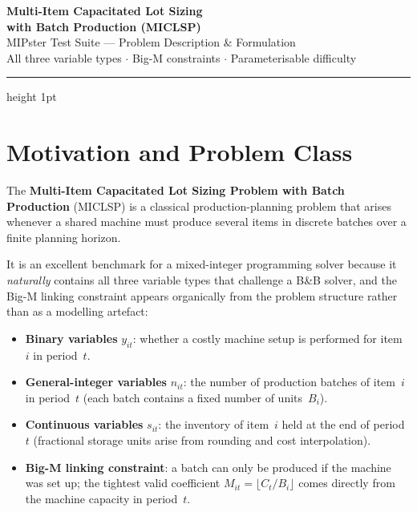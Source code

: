 \documentclass[11pt,a4paper]{article}
\begin{document}
\begin{center}
  {\LARGE\bfseries\color{mipblue}
    Multi-Item Capacitated Lot Sizing\\[4pt]
    with Batch Production (MICLSP)}\\[0.8em]
  {\large\color{mipgray} MIPster Test Suite --- Problem Description \& Formulation}\\[0.4em]
  {\small\color{mipgray} All three variable types $\cdot$ Big-M constraints $\cdot$
   Parameterisable difficulty}
\end{center}

\vspace{0.5em}
\hrule height 1pt
\vspace{1.5em}

\section{Motivation and Problem Class}

The \textbf{Multi-Item Capacitated Lot Sizing Problem with Batch Production}
(MICLSP) is a classical production-planning problem that arises whenever a
shared machine must produce several items in discrete batches over a finite
planning horizon.

It is an excellent benchmark for a mixed-integer programming solver because
it \emph{naturally} contains all three variable types that challenge a B\&B
solver, and the Big-M linking constraint appears organically from the problem
structure rather than as a modelling artefact:

\begin{itemize}[leftmargin=1.8em]
  \item \textbf{Binary variables} $y_{it}$: whether a costly machine setup is
        performed for item~$i$ in period~$t$.
  \item \textbf{General-integer variables} $n_{it}$: the number of production
        batches of item~$i$ in period~$t$ (each batch contains a fixed number
        of units~$B_i$).
  \item \textbf{Continuous variables} $s_{it}$: the inventory of item~$i$ held
        at the end of period~$t$ (fractional storage units arise from rounding
        and cost interpolation).
  \item \textbf{Big-M linking constraint}: a batch can only be produced if the
        machine was set up; the tightest valid coefficient
        $M_{it}=\lfloor C_t/B_i\rfloor$ comes directly from the machine
        capacity in period~$t$.
\end{itemize}
\end{document}
